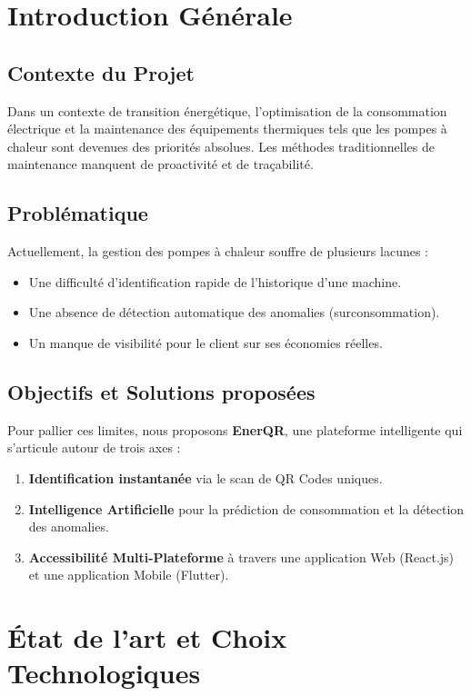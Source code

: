 \documentclass[12pt, a4paper, twoside]{report}
\begin{document}
\chapter{Introduction Générale}
\section{Contexte du Projet}
Dans un contexte de transition énergétique, l'optimisation de la consommation électrique et la maintenance des équipements thermiques tels que les pompes à chaleur sont devenues des priorités absolues. Les méthodes traditionnelles de maintenance manquent de proactivité et de traçabilité.

\section{Problématique}
Actuellement, la gestion des pompes à chaleur souffre de plusieurs lacunes :
\begin{itemize}
    \item Une difficulté d'identification rapide de l'historique d'une machine.
    \item Une absence de détection automatique des anomalies (surconsommation).
    \item Un manque de visibilité pour le client sur ses économies réelles.
\end{itemize}

\section{Objectifs et Solutions proposées}
Pour pallier ces limites, nous proposons \textbf{EnerQR}, une plateforme intelligente qui s'articule autour de trois axes :
\begin{enumerate}
    \item \textbf{Identification instantanée} via le scan de QR Codes uniques.
    \item \textbf{Intelligence Artificielle} pour la prédiction de consommation et la détection des anomalies.
    \item \textbf{Accessibilité Multi-Plateforme} à travers une application Web (React.js) et une application Mobile (Flutter).
\end{enumerate}

\chapter{État de l'art et Choix Technologiques}
\end{document}

